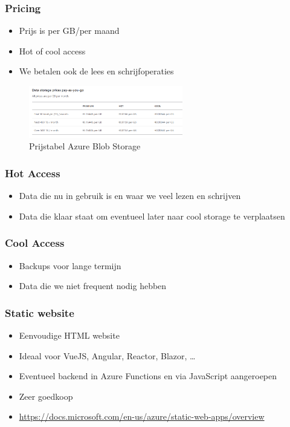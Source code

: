 \documentclass{article}
\begin{document}
\subsubsection{Pricing}

\begin{itemize}
    \item Prijs is per GB/per maand
    \item Hot of cool access
    \item We betalen ook de lees en schrijfoperaties
\end{itemize}

\begin{figure}[H]
    \centering
    \includegraphics[width=0.6\textwidth]{azure-storage-blob-pricing.png}
    \caption{Prijstabel Azure Blob Storage}
\end{figure}

\subsubsection{Hot Access}

\begin{itemize}
    \item Data die nu in gebruik is en waar we veel lezen en schrijven
    \item Data die klaar staat om eventueel later naar cool storage te verplaatsen
\end{itemize}

\subsubsection{Cool Access}

\begin{itemize}
    \item Backups voor lange termijn
    \item Data die we niet frequent nodig hebben
\end{itemize}

\subsubsection{Static website}

\begin{itemize}
    \item Eenvoudige HTML website
    \item Ideaal voor VueJS, Angular, Reactor, Blazor, \dots
    \item Eventueel backend in Azure Functions en via JavaScript aangeroepen
    \item Zeer goedkoop
    \item \url{https://docs.microsoft.com/en-us/azure/static-web-apps/overview}
\end{itemize}
\end{document}
